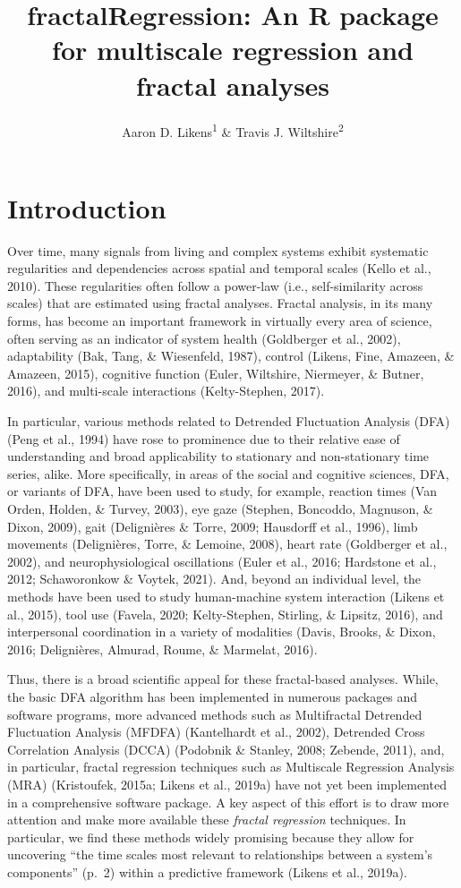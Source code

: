 \documentclass[
  man]{apa6}
\title{fractalRegression: An R package for multiscale regression and fractal analyses}
\author{Aaron D. Likens\textsuperscript{1} \& Travis J. Wiltshire\textsuperscript{2}}
\date{}
\affiliation{\vspace{0.5cm}\textsuperscript{1} Department of Biomechanics, University of Nebraska at Omaha\\\textsuperscript{2} Department of Cognitive Science \& Artificial Intelligence, Tilburg University}
\begin{document}
\maketitle

\hypertarget{introduction}{%
\section{Introduction}\label{introduction}}

Over time, many signals from living and complex systems exhibit
systematic regularities and dependencies across spatial and temporal
scales (Kello et al., 2010). These regularities often follow
a power-law (i.e., self-similarity across scales) that are estimated
using fractal analyses. Fractal analysis, in its many forms, has become
an important framework in virtually every area of science, often serving
as an indicator of system health
(Goldberger et al., 2002), adaptability
(Bak, Tang, \& Wiesenfeld, 1987), control
(Likens, Fine, Amazeen, \& Amazeen, 2015), cognitive function
(Euler, Wiltshire, Niermeyer, \& Butner, 2016), and multi-scale interactions
(Kelty-Stephen, 2017).

In particular, various methods related to Detrended Fluctuation Analysis
(DFA) (Peng et al., 1994) have rose to prominence due to
their relative ease of understanding and broad applicability to
stationary and non-stationary time series, alike. More specifically, in
areas of the social and cognitive sciences, DFA, or variants of DFA,
have been used to study, for example, reaction times
(Van Orden, Holden, \& Turvey, 2003), eye gaze
(Stephen, Boncoddo, Magnuson, \& Dixon, 2009), gait
(Delignières \& Torre, 2009; Hausdorff et al., 1996), limb movements
(Delignières, Torre, \& Lemoine, 2008), heart rate
(Goldberger et al., 2002), and neurophysiological
oscillations (Euler et al., 2016; Hardstone et al., 2012; Schaworonkow \& Voytek, 2021). And, beyond an individual level,
the methods have been used to study human-machine system interaction
(Likens et al., 2015), tool use
(Favela, 2020; Kelty-Stephen, Stirling, \& Lipsitz, 2016), and interpersonal coordination
in a variety of modalities
(Davis, Brooks, \& Dixon, 2016; Delignières, Almurad, Roume, \& Marmelat, 2016).

Thus, there is a broad scientific appeal for these fractal-based
analyses. While, the basic DFA algorithm has been implemented in
numerous packages and software programs, more advanced methods such as
Multifractal Detrended Fluctuation Analysis (MFDFA)
(Kantelhardt et al., 2002), Detrended Cross
Correlation Analysis (DCCA)
(Podobnik \& Stanley, 2008; Zebende, 2011), and, in particular,
fractal regression techniques such as Multiscale Regression Analysis
(MRA) (Kristoufek, 2015a; Likens et al., 2019a) have not yet been
implemented in a comprehensive software package. A key aspect of this
effort is to draw more attention and make more available these \emph{fractal
regression} techniques. In particular, we find these methods widely
promising because they allow for uncovering ``the time scales most
relevant to relationships between a system's components'' (p.~2) within a
predictive framework (Likens et al., 2019a).
\end{document}
